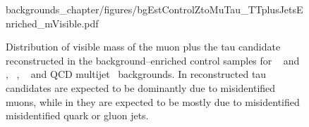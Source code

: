 \begin{figure}
\begin{center}
{  {backgrounds_chapter/figures/bgEstControlZtoMuTau_TTplusJetsEnriched_mVisible.pdf}
  \label{fig:becrTTpJ_mVisible}
  }
\caption[Visible mass distribution of the backgrounds in the signal and control
regions]{\captiontext 
	 Distribution of visible mass of the muon plus the tau candidate reconstructed
         in the background--enriched control samples for 
         \ZMM~ and
         ,
         \WpJets~,
         \ttbarpJets~ and QCD
         multijet~ backgrounds.
         In  reconstructed tau candidates are expected to be dominantly due to misidentified muons,
         while in  they are expected to be mostly due to misidentified misidentified quark or gluon jets.}
\label{fig:VisMassMuTauBgControlRegions}
\end{center}
\end{figure} 
%
